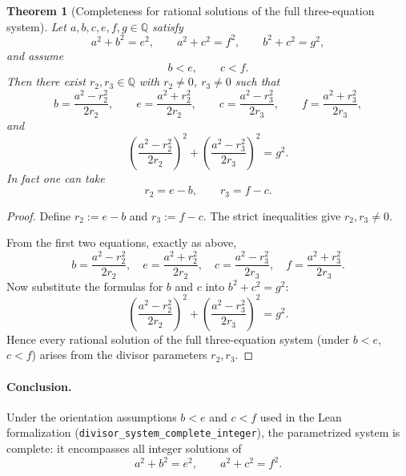 \documentclass[11pt]{article}
\newtheorem{theorem}{Theorem}
\begin{document}
\begin{theorem}[Completeness for rational solutions of the full three-equation system]
Let $a,b,c,e,f,g\in\mathbb{Q}$ satisfy
\[
a^2+b^2=e^2,\qquad
a^2+c^2=f^2,\qquad
b^2+c^2=g^2,
\]
and assume
\[
b<e,\qquad c<f.
\]
Then there exist $r_2,r_3\in\mathbb{Q}$ with $r_2\neq 0$, $r_3\neq 0$ such that
\[
b=\frac{a^2-r_2^2}{2r_2},\qquad
e=\frac{a^2+r_2^2}{2r_2},\qquad
c=\frac{a^2-r_3^2}{2r_3},\qquad
f=\frac{a^2+r_3^2}{2r_3},
\]
and
\[
\left(\frac{a^2-r_2^2}{2r_2}\right)^2
+
\left(\frac{a^2-r_3^2}{2r_3}\right)^2
=
g^2.
\]
In fact one can take
\[
r_2=e-b,\qquad r_3=f-c.
\]
\end{theorem}

\begin{proof}
Define $r_2:=e-b$ and $r_3:=f-c$. The strict inequalities give $r_2,r_3\neq 0$.

From the first two equations, exactly as above,
\[
b=\frac{a^2-r_2^2}{2r_2},\quad
e=\frac{a^2+r_2^2}{2r_2},\quad
c=\frac{a^2-r_3^2}{2r_3},\quad
f=\frac{a^2+r_3^2}{2r_3}.
\]
Now substitute the formulas for $b$ and $c$ into $b^2+c^2=g^2$:
\[
\left(\frac{a^2-r_2^2}{2r_2}\right)^2
+
\left(\frac{a^2-r_3^2}{2r_3}\right)^2
=
g^2.
\]
Hence every rational solution of the full three-equation system (under
$b<e$, $c<f$) arises from the divisor parameters $r_2,r_3$.
\end{proof}

\paragraph{Conclusion.}
Under the orientation assumptions $b<e$ and $c<f$ used in the Lean formalization
(\texttt{divisor\_system\_complete\_integer}), the parametrized system is complete:
it encompasses all integer solutions of
\[
a^2+b^2=e^2,\qquad a^2+c^2=f^2.
\]
\end{document}
